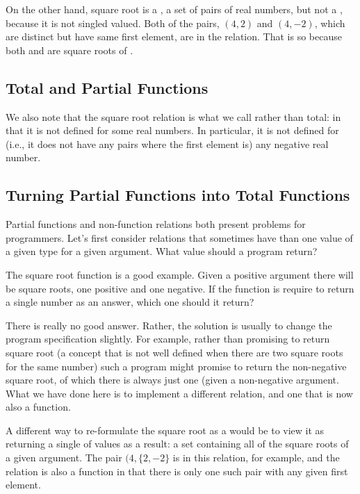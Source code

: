 \documentclass[letterpaper,10pt,english]{sphinxmanual}
\begin{document}
On the other hand, square root is a , a set of pairs of real
numbers, but not a , because it is not singled valued. Both
of the pairs, \((4,2)\) and \((4,-2)\), which are distinct but
have same first element, are in the relation. That is so because both
 and  are square roots of .


\subsection{Total and Partial Functions}
\label{\detokenize{05-putting-it-together:total-and-partial-functions}}
We also note that the square root relation  is
what we call  rather than total: in that it is not defined
for some real numbers. In particular, it is not defined for (i.e., it
does not have any pairs where the first element is) any negative real
number.


\subsection{Turning Partial Functions into Total Functions}
\label{\detokenize{05-putting-it-together:turning-partial-functions-into-total-functions}}
Partial functions and non-function relations both present problems for
programmers. Let’s first consider relations that sometimes have 
than one value of a given type for a given argument. What value should
a program return?

The square root function is a good example. Given a positive argument
there will be  square roots, one positive and one negative. If
the function is require to return a single number as an answer, which
one should it return?

There is really no good answer. Rather, the solution is usually to
change the program specification slightly. For example, rather than
promising to return  square root (a concept that is not well
defined when there are two square roots for the same number) such a
program might promise to return the non-negative square root, of which
there is always just one (given a non-negative argument. What we have
done here is to implement a different relation, and one that is now
also a function.

A different way to re-formulate the square root  as a
 would be to view it as returning a single  of values
as a result: a set containing all of the square roots of a given
argument.  The pair \((4, \{2, -2\}\) is in this relation, for
example, and the relation is also a function in that there is only one
such pair with any given first element.
\end{document}
